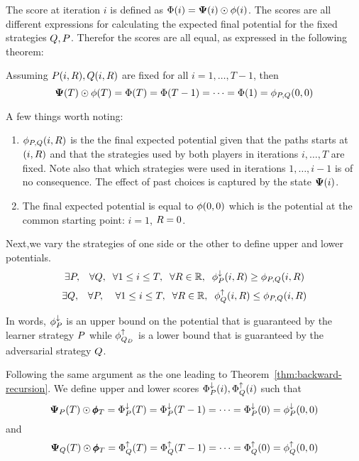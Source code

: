\documentclass{article}[12pt]
\begin{document}
The score at iteration $i$ is defined as
$\Phi(i)={\bf \Psi}(i)\odot \phi(i)$. The scores are all different
expressions for calculating the expected final potential for the fixed strategies
$Q, P$. Therefor the scores are all equal, as expressed
in the following theorem:

\begin{theorem} \label{thm:backward-recursion}
Assuming $ P(i,R), Q(i,R)$ are fixed for all
$i=1,\ldots,T-1$, then
\[
  {\bf \Psi}(T)\odot \phi(T)=\Phi(T)=\Phi(T-1)=\cdots=\Phi(1)=\phi_{P,Q}(0,0)
  \]
\end{theorem}

A few things worth noting:
\begin{enumerate}
\item $\phi_{P,Q}(i,R)$ is the the final expected potential
  given that the paths starts at $(i,R)$ and that
  the strategies used by both players in iterations $i,\ldots,T$ are fixed. Note
  also that which strategies were used in iterations $1,\ldots,i-1$ is
  of no consequence. The effect of past choices is captured by the
  state ${\bf \Psi}(i)$.
\item
  The final expected potential is equal to $\phi(0,0)$ which is the
  potential at the common starting point: $i=1$, $R=0$.
\end{enumerate}


Next,we vary the strategies of one side or the other to define upper
and lower potentials.
\begin{equation} \label{eqn:upperPotentials}
  \exists P, \;\;\; \forall Q,\;\; \forall 1\leq i \leq
  T,\;\; \forall R \in \mathbb{R},\;\; \phi_{P}^{\downarrow}(i,R) \geq \phi_{P,Q}(i,R)
\end{equation}
\begin{equation} \label{eqn:lowerPotentials}
  \exists Q, \;\;\; \forall P, \;\; \;\; \forall 1\leq i \leq
  T,\;\; \forall R \in \mathbb{R},\;\; \phi_{Q}^{\uparrow}(i,R) \leq \phi_{P,Q}(i,R)
\end{equation}

In words, $\phi_{P}^{\downarrow}$ is an upper bound on the potential that is 
guaranteed by the learner strategy $P$ while $\phi_{Q_D}^{\uparrow}$
is a lower bound that is guaranteed by the adversarial
strategy $Q$.

Following the same argument as the one leading to
Theorem~\ref{thm:backward-recursion}. We define upper and lower scores
$\Phi_{P}^{\downarrow}(i),\Phi_{Q}^{\uparrow}(i)$ such that
\begin{equation} \label{eqn:upper-recursion}
  {\bf \Psi}_{P}(T)\odot \pmb{\phi}_{T}=\Phi_{P}^{\downarrow}(T)=\Phi_{P}^{\downarrow}(T-1)=\cdots=\Phi_{P}^{\downarrow}(0)=\phi_{P}^{\downarrow}(0,0)
\end{equation}
and
\begin{equation} \label{eqn:lower-recursion}
  {\bf \Psi}_{Q}(T)\odot \pmb{\phi}_{T}=\Phi_{Q}^{\uparrow}(T)=\Phi_{Q}^{\uparrow}(T-1)=\cdots=\Phi_{Q}^{\uparrow}(0)=\phi_{Q}^{\uparrow}(0,0)
\end{equation}
\end{document}
